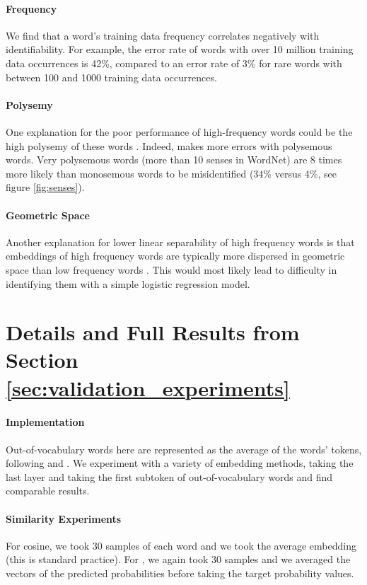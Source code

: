 \paragraph{Frequency} We find that a word's training data frequency correlates negatively with identifiability. For example, the error rate of words with over 10 million training data occurrences is 42\%, compared to an error rate of 3\% for rare words with between 100 and 1000 training data occurrences.

\paragraph{Polysemy}
One explanation for the poor performance of high-frequency words could be the high polysemy of these words \citep{zipf1945meaning}. Indeed, \wc makes more errors with polysemous words. Very polysemous words (more than 10 senses in WordNet) are 8 times more likely than monosemous words to be misidentified (34\% versus 4\%, see figure \ref{fig:senses}). 

\paragraph{Geometric Space}
Another explanation for lower linear separability of high frequency words is that embeddings of high frequency words are typically more dispersed in geometric space than low frequency words \cite{zhou-etal-2022-problems}. This would most likely lead to difficulty in identifying them with a simple logistic regression model. 



\section{Details and Full Results from Section \ref{sec:validation_experiments}}
\label{appendix:validation_details}
\paragraph{Implementation}
Out-of-vocabulary words here are represented as the average of the words' tokens, following \citet{pilehvar-camacho-collados-2019-wic} and \citet{blevins-zettlemoyer-2020-moving}.
We experiment with a variety of embedding methods, taking the last layer and taking the first subtoken of out-of-vocabulary words and find comparable results.

\paragraph{Similarity Experiments}
For cosine, we took 30 samples of each word and we took the average embedding (this is standard practice). For \wc, we again took 30 samples and we averaged the vectors of the predicted probabilities before taking the target probability values.

